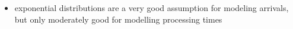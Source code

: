 \documentclass[a4paper]{article}
\makeatletter
\renewcommand{\section}{\@startsection{section}{1}{0mm}%
                                {-1ex plus -.5ex minus -.2ex}%
                                {0.5ex plus .2ex}%
                                {\normalfont\large\bfseries}}
\renewcommand{\subsection}{\@startsection{subsection}{2}{0mm}%
                                {-1explus -.5ex minus -.2ex}%
                                {0.5ex plus .2ex}%
                                {\normalfont\normalsize\bfseries}}
\makeatother
\begin{document}
\begin{multicols*}{3}
\begin{itemize}
    \item
    exponential distributions are a very good assumption for modeling arrivals, but only moderately good for modelling processing times
\end{itemize}










\end{multicols*}
\end{document}
